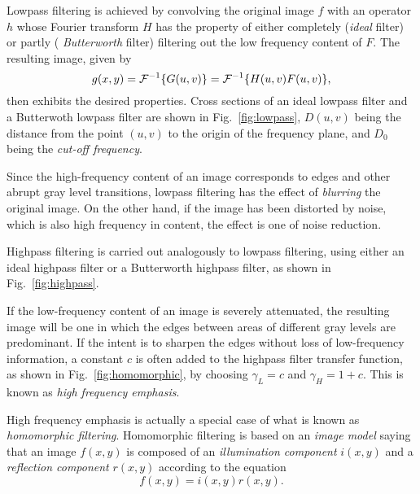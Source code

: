 Lowpass filtering is achieved by convolving the original image $f$
with an operator $h$ whose Fourier transform $H$ has the property of
either completely ({\em ideal\/} filter) or partly ({\em
  Butterworth\/} filter) filtering out the low frequency content of
$F$.  The resulting image, given by
\begin{equation}
  g(x,y)={\cal F}^{-1}\{G(u,v)\}={\cal F}^{-1}\{H(u,v)F(u,v)\}\mbox{,}
\end{equation}
then exhibits the desired properties.  Cross sections of an ideal
lowpass filter and a Butterwoth lowpass filter are shown in
Fig.~\ref{fig:lowpass}, $D(u,v)$ being the distance from the point
$(u,v)$ to the origin of the frequency plane, and $D_{0}$ being the
{\em cut-off frequency\/}.


Since the high-frequency content of an image corresponds to edges and
other abrupt gray level transitions, lowpass filtering has the effect
of {\em blurring\/} the original image.  On the other hand, if the
image has been distorted by noise, which is also high frequency in
content, the effect is one of noise reduction.

Highpass filtering is carried out analogously to lowpass filtering,
using either an ideal highpass filter or a Butterworth highpass
filter, as shown in Fig.~\ref{fig:highpass}.


If the low-frequency content of an image is severely attenuated, the
resulting image will be one in which the edges between areas of
different gray levels are predominant.  If the intent is to sharpen
the edges without loss of low-frequency information, a constant $c$ is
often added to the highpass filter transfer function, as shown in
Fig.~\ref{fig:homomorphic}, by choosing $\gamma_{L}=c$ and
$\gamma_{H}=1+c$.  This is known as {\em high frequency emphasis\/}.


High frequency emphasis is actually a special case of what is known as
{\em homomorphic filtering\/}.  Homomorphic filtering is based on an
{\em image model\/} saying that an image $f(x,y)$ is composed of an
{\em illumination component\/} $i(x,y)$ and a {\em reflection
  component\/} $r(x,y)$ according to the equation
\begin{equation}
  f(x,y)=i(x,y)r(x,y)\mbox{.}
\end{equation}

